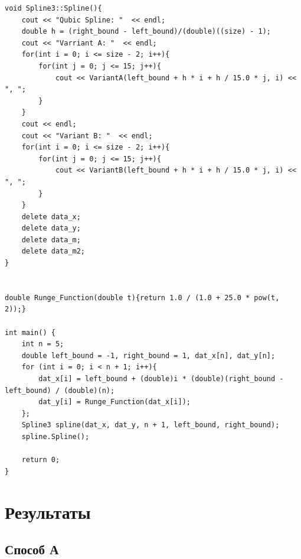 \documentclass[
11pt,
master, %
subf, %
href, %
colorlinks=true, %
times, %
]{disser}
\begin{document}
{\begin{verbatim}
void Spline3::Spline(){
    cout << "Qubic Spline: "  << endl;
    double h = (right_bound - left_bound)/(double)((size) - 1);
    cout << "Varriant A: "  << endl;
    for(int i = 0; i <= size - 2; i++){
        for(int j = 0; j <= 15; j++){
            cout << VariantA(left_bound + h * i + h / 15.0 * j, i) << ", ";
        }
    }
    cout << endl;
    cout << "Variant B: "  << endl;
    for(int i = 0; i <= size - 2; i++){
        for(int j = 0; j <= 15; j++){
            cout << VariantB(left_bound + h * i + h / 15.0 * j, i) << ", ";
        }
    }
    delete data_x;
    delete data_y;
    delete data_m;
    delete data_m2;
}


double Runge_Function(double t){return 1.0 / (1.0 + 25.0 * pow(t, 2));}

int main() {
    int n = 5;
    double left_bound = -1, right_bound = 1, dat_x[n], dat_y[n];
    for (int i = 0; i < n + 1; i++){
        dat_x[i] = left_bound + (double)i * (double)(right_bound - left_bound) / (double)(n);
        dat_y[i] = Runge_Function(dat_x[i]);
    };
    Spline3 spline(dat_x, dat_y, n + 1, left_bound, right_bound);
    spline.Spline();

    return 0;
}
\end{verbatim}
}

\newpage
\section{Результаты}
\subsection{Способ А}
\end{document}
